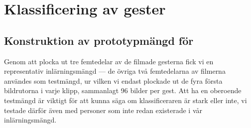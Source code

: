 \documentclass[../rapport_MVEX01-11-05]{subfiles}
\begin{document}
\section{Klassificering av gester} 

\subsection{Konstruktion av prototypmängd för \knn}

Genom att plocka ut tre femtedelar av de filmade gesterna fick vi en
representativ inlärningsmängd --- de övriga två femtedelarna av filmerna 
användes som testmängd, ur vilken vi endast plockade ut
de fyra första bildrutorna i varje klipp, sammanlagt 96 bilder per gest.
Att ha en oberoende testmängd är viktigt för att kunna säga om klassificeraren är
stark eller inte, vi testade därför även med personer som inte redan 
existerade i vår inlärningsmängd.

%
\end{document}

